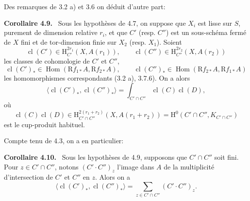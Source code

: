 \documentclass[11pt]{article}
\newenvironment{statement}[1]{\par\medskip\noindent\textbf{#1.}\ }{\par\medskip}
\renewcommand{\H}{\mathrm{H}}
\DeclareMathOperator{\Hom}{Hom}
\newcommand{\R}{\mathrm{R}}
\providecommand{\cl}{\operatorname{cl}}
\providecommand{\Hom}{\operatorname{Hom}}
\providecommand{\R}{\mathrm R}
\providecommand{\cl}{\operatorname{cl}}
\providecommand{\Hom}{\operatorname{Hom}}
\providecommand{\cl}{\operatorname{cl}}
\begin{document}
Des remarques de 3.2 a) et 3.6 on déduit d'autre part:

\begin{statement}{Corollaire 4.9}
Sous les hypothèses de 4.7, on suppose que $X_i$ est lisse sur $S$, purement de dimension relative $r_i$, et que $C'$ (resp. $C''$) est un sous-schéma fermé de $X$ fini et de tor-dimension finie sur $X_2$ (resp. $X_1$). Soient
\[
\cl(C')\in \H_{C'}^{2r_1}(X,A(r_1)),\qquad
\cl(C'')\in \H_{C''}^{2r_2}(X,A(r_2))
\]
les classes de cohomologie de $C'$ et $C''$,
\[
\cl(C')_*\in\Hom(\R f_{1*}A,\R f_{2*}A),\qquad
\cl(C'')_*\in\Hom(\R f_{2*}A,\R f_{1*}A)
\]
les homomorphismes correspondants (3.2 a), 3.7.6). On a alors
\[
\langle \cl(C')_*,\cl(C'')_*\rangle
=
\int_{C'\cap C''}\cl(C)\cl(D),
\]
où
\[
\cl(C)\cl(D)\in
\H_{C'\cap C''}^{2(r_1+r_2)}(X,A(r_1+r_2))
=
\H^0(C'\cap C'',K_{C'\cap C''})
\]
est le cup-produit habituel.
\end{statement}

Compte tenu de 4.3, on a en particulier:

\begin{statement}{Corollaire 4.10}
Sous les hypothèses de 4.9, supposons que $C'\cap C''$ soit fini. Pour $z\in C'\cap C''$, notons $(C'\!\cdot C'')_z$ l'image dans $A$ de la multiplicité d'intersection de $C'$ et $C''$ en $z$. Alors on a
\[
\langle \cl(C')_*,\cl(C'')_*\rangle
=
\sum_{z\in C'\cap C''}(C'\!\cdot C'')_z.
\]
\end{statement}
\end{document}
